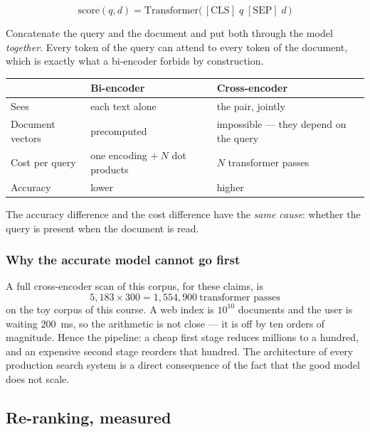 \documentclass[11pt,a4paper]{article}
\begin{document}
\[
  \text{score}(q,d) = \text{Transformer}\big(\,[\text{CLS}]\;q\;[\text{SEP}]\;d\,\big)
\]

Concatenate the query and the document and put both through the model
\emph{together}. Every token of the query can attend to every token of the
document, which is exactly what a bi-encoder forbids by construction.

\begin{center}
\small
\begin{tabular}{p{}p{}p{}}
\toprule
 & \textbf{Bi-encoder} & \textbf{Cross-encoder} \\
\midrule
Sees & each text alone & the pair, jointly \\
Document vectors & precomputed & impossible --- they depend on the query \\
Cost per query & one encoding $+\ N$ dot products & $N$ transformer passes \\
Accuracy & lower & higher \\
\bottomrule
\end{tabular}
\end{center}

\begin{keybox}[title={One sentence worth being able to say}]
The accuracy difference and the cost difference have the \emph{same cause}:
whether the query is present when the document is read.
\end{keybox}

\subsubsection{Why the accurate model cannot go first}

A full cross-encoder scan of this corpus, for these claims, is
\[ 5{,}183 \times 300 = 1{,}554{,}900 \ \text{transformer passes} \]
on the toy corpus of this course. A web index is $10^{10}$ documents and the
user is waiting 200~ms, so the arithmetic is not close --- it is off by ten
orders of magnitude. Hence the pipeline: a cheap first stage reduces millions
to a hundred, and an expensive second stage reorders that hundred. The
architecture of every production search system is a direct consequence of the
fact that the good model does not scale.

\subsection{Re-ranking, measured}
\end{document}
